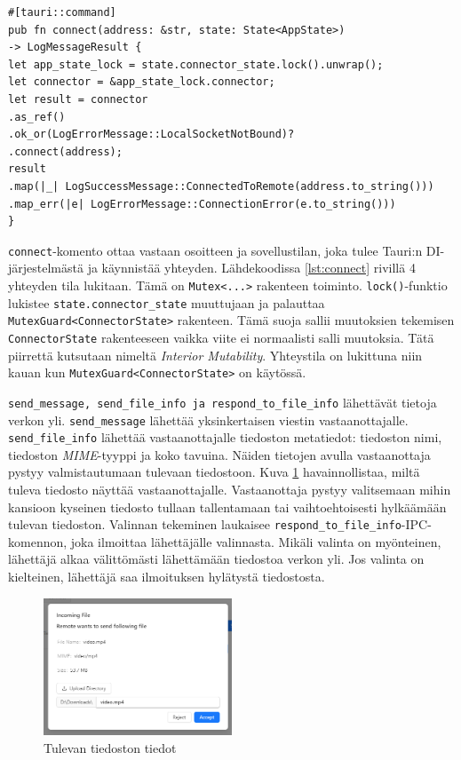 \documentclass[a4paper,12pt]{article}
\begin{document}
    \begin{lstlisting}[basicstyle=\small\ttfamily,caption={'connect'-komento}, label={lst:connect}]
#[tauri::command]
pub fn connect(address: &str, state: State<AppState>)
-> LogMessageResult {
let app_state_lock = state.connector_state.lock().unwrap();
let connector = &app_state_lock.connector;
let result = connector
.as_ref()
.ok_or(LogErrorMessage::LocalSocketNotBound)?
.connect(address);
result
.map(|_| LogSuccessMessage::ConnectedToRemote(address.to_string()))
.map_err(|e| LogErrorMessage::ConnectionError(e.to_string()))
}
    \end{lstlisting}


    \lstinline{connect}-komento ottaa vastaan osoitteen ja sovellustilan, joka tulee Tauri:n DI-järjestelmästä ja käynnistää yhteyden. Lähdekoodissa \ref{lst:connect} rivillä 4 yhteyden tila lukitaan.
    Tämä on \lstinline{Mutex<...>} rakenteen toiminto. \lstinline{lock()}-funktio lukistee \lstinline{state.connector_state} muuttujaan ja palauttaa \lstinline{MutexGuard<ConnectorState>} rakenteen. Tämä suoja sallii muutoksien tekemisen \lstinline{ConnectorState} rakenteeseen vaikka viite ei normaalisti salli muutoksia. Tätä piirrettä kutsutaan nimeltä \textit{Interior Mutability}. Yhteystila on lukittuna niin kauan kun \lstinline{MutexGuard<ConnectorState>} on käytössä.\par

    \lstinline{send_message, send_file_info ja respond_to_file_info} lähettävät tietoja verkon yli. \lstinline{send_message} lähettää yksinkertaisen viestin vastaanottajalle.
    \lstinline{send_file_info} lähettää vastaanottajalle tiedoston metatiedot: tiedoston nimi, tiedoston \textit{MIME}-tyyppi ja koko tavuina. Näiden tietojen avulla vastaanottaja pystyy valmistautumaan tulevaan tiedostoon. Kuva \ref{fig:incoming_file} havainnollistaa, miltä tuleva tiedosto näyttää vastaanottajalle. Vastaanottaja pystyy valitsemaan mihin kansioon kyseinen tiedosto tullaan tallentamaan tai vaihtoehtoisesti hylkäämään tulevan tiedoston. Valinnan tekeminen laukaisee \lstinline{respond_to_file_info}-IPC-komennon, joka ilmoittaa lähettäjälle valinnasta.
    Mikäli valinta on myönteinen, lähettäjä alkaa välittömästi lähettämään tiedostoa verkon yli. Jos valinta on kielteinen, lähettäjä saa ilmoituksen hylätystä tiedostosta.

    \begin{figure}[h!]
        \centering
        \includegraphics[width=0.5\textwidth]{doc/latex/src/images/incoming_file.png}
        \caption{Tulevan tiedoston tiedot}
        \label{fig:incoming_file}
    \end{figure}
\end{document}
